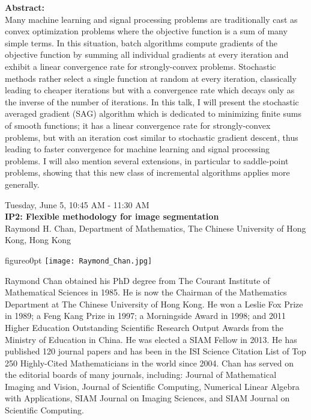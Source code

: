 \textbf{Abstract:}\\

Many machine learning and signal processing problems are traditionally cast as convex optimization problems where the objective function is a sum of many simple terms. In this situation, batch algorithms compute gradients of the objective function by summing all individual gradients at every iteration and exhibit a linear convergence rate for strongly-convex problems. Stochastic methods rather select a single function at random at every iteration, classically leading to cheaper iterations but with a convergence rate which decays only as the inverse of the number of iterations. In this talk, I will present the stochastic averaged gradient (SAG) algorithm which is dedicated to minimizing finite sums of smooth functions; it has a linear convergence rate for strongly-convex problems, but with an iteration cost similar to stochastic gradient descent, thus leading to faster convergence for machine learning and signal processing problems. I will also mention several extensions, in particular to saddle-point problems, showing that this new class of incremental algorithms applies more generally.

\newpage\vspace{2cm}
\begin{center}{\Large{
Tuesday, June 5, 10:45 AM - 11:30 AM \\
\textbf{IP2: Flexible methodology for image segmentation}\\
Raymond H. Chan, Department of Mathematics, The Chinese University of Hong Kong,  Hong Kong}}
\end{center}
\vspace{1cm}

\begin{wrapfloat}{figure}{o}{0pt}
\texttt{[image: Raymond\_Chan.jpg]}
\end{wrapfloat}

Raymond Chan obtained his PhD degree from The Courant Institute of Mathematical Sciences in 1985. He is now the Chairman of the Mathematics Department at The Chinese University of Hong Kong. He won a Leslie Fox Prize in 1989; a Feng Kang Prize in 1997; a Morningside Award in 1998; and 2011 Higher Education Outstanding Scientific Research Output Awards from the Ministry of Education in China. He was elected a SIAM Fellow in 2013. He has published 120 journal papers and has been in the ISI Science Citation List of Top 250 Highly-Cited Mathematicians in the world since 2004. Chan has served on the editorial boards of many journals, including: Journal of Mathematical Imaging and Vision, Journal of Scientific Computing, Numerical Linear Algebra with Applications, SIAM Journal on Imaging Sciences, and SIAM Journal on Scientific Computing. 

